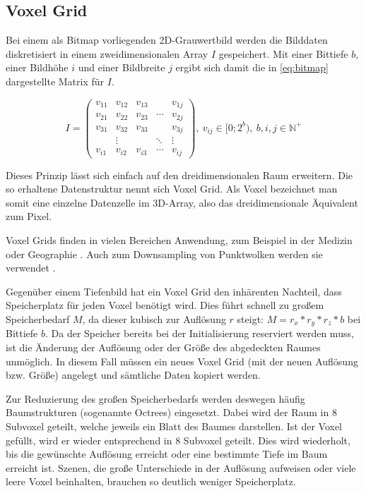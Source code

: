 \subsection{Voxel Grid}
\label{subsec:voxel-grid}

Bei einem als Bitmap vorliegenden 2D-Grauwertbild werden die Bilddaten diskretisiert in einem zweidimensionalen Array $I$ gespeichert.
Mit einer Bittiefe $b$, einer Bildhöhe $i$ und einer Bildbreite $j$ ergibt sich damit die in \autoref{eq:bitmap} dargestellte Matrix für $I$.

\begin{equation}
I = \begin{pmatrix}
v_{11} & v_{12} & v_{13} &        & v_{1j}\\
v_{21} & v_{22} & v_{23} & \cdots & v_{2j}\\
v_{31} & v_{32} & v_{33} &        & v_{3j}\\
       & \vdots &        & \ddots & \vdots\\
v_{i1} & v_{i2} & v_{i3} & \cdots & v_{ij}
\end{pmatrix},\ v_{ij} \in [0; 2^b),\ b, i, j \in \mathbb{N}^+
\label{eq:bitmap}
\end{equation}

Dieses Prinzip lässt sich einfach auf den dreidimensionalen Raum erweitern.
Die so erhaltene Datenstruktur nennt sich Voxel Grid.
Als Voxel bezeichnet man somit eine einzelne Datenzelle im 3D-Array, also das dreidimensionale Äquivalent zum Pixel.

Voxel Grids finden in vielen Bereichen Anwendung, zum Beispiel in der Medizin \cite{van2008hippocampus, klein2009elastix, mohanty2012secure, roche1999towards} oder Geographie \cite{chmielewski2017estimating}.
Auch zum Downsampling von Punktwolken werden sie verwendet \cite{pclVoxelGrid}. %

Gegenüber einem Tiefenbild hat ein Voxel Grid den inhärenten Nachteil, dass Speicherplatz für jeden Voxel benötigt wird.
Dies führt schnell zu großem Speicherbedarf $M$, da dieser kubisch zur Auflösung $r$ steigt: $M = r_x * r_y * r_z * b$ bei Bittiefe $b$.
Da der Speicher bereits bei der Initialisierung reserviert werden muss, ist die Änderung der Auflösung oder der Größe des abgedeckten Raumes unmöglich.
In diesem Fall müssen ein neues Voxel Grid (mit der neuen Auflösung bzw. Größe) angelegt und sämtliche Daten kopiert werden.

Zur Reduzierung des großen Speicherbedarfs werden deswegen häufig Baumstrukturen (sogenannte Octrees) eingesetzt.
Dabei wird der Raum in 8 Subvoxel geteilt, welche jeweils ein Blatt des Baumes darstellen.
Ist der Voxel gefüllt, wird er wieder entsprechend in 8 Subvoxel geteilt.
Dies wird wiederholt, bis die gewünschte Auflösung erreicht oder eine bestimmte Tiefe im Baum erreicht ist.
Szenen, die große Unterschiede in der Auflösung aufweisen oder viele leere Voxel beinhalten, brauchen so deutlich weniger Speicherplatz.

